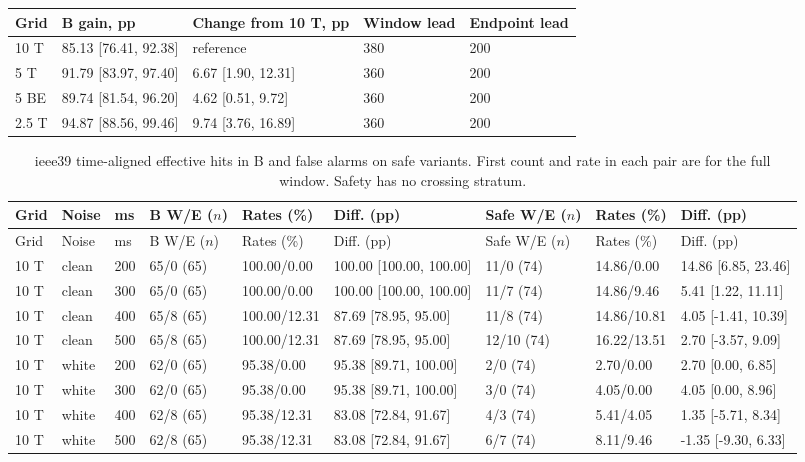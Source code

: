 \documentclass[10pt]{article}
\begin{document}
\begin{table}[htbp]
\begin{tabular}{@{}lllll@{}}
\toprule Grid & B gain, pp & Change from 10 T, pp & Window lead & Endpoint lead \\\midrule
10 T & 85.13 [76.41, 92.38] & reference & 380 & 200 \\
5 T & 91.79 [83.97, 97.40] & 6.67 [1.90, 12.31] & 360 & 200 \\
5 BE & 89.74 [81.54, 96.20] & 4.62 [0.51, 9.72] & 360 & 200 \\
2.5 T & 94.87 [88.56, 99.46] & 9.74 [3.76, 16.89] & 360 & 200 \\
\bottomrule\end{tabular}\end{table}\begingroup\footnotesize\setlength{\tabcolsep}{3pt}
\begin{longtable}{@{}lllllllll@{}}
\caption{ieee39 time-aligned effective hits in B and false alarms on safe variants. First count and rate in each pair are for the full window. Safety has no crossing stratum.}\label{tab:r2ieee39}\\
\toprule Grid & Noise & ms & B W/E ($n$) & Rates (\%) & Diff. (pp) & Safe W/E ($n$) & Rates (\%) & Diff. (pp) \\\midrule\endfirsthead
\toprule Grid & Noise & ms & B W/E ($n$) & Rates (\%) & Diff. (pp) & Safe W/E ($n$) & Rates (\%) & Diff. (pp) \\\midrule\endhead
10 T & clean & 200 & 65/0 (65) & 100.00/0.00 & 100.00 [100.00, 100.00] & 11/0 (74) & 14.86/0.00 & 14.86 [6.85, 23.46] \\
10 T & clean & 300 & 65/0 (65) & 100.00/0.00 & 100.00 [100.00, 100.00] & 11/7 (74) & 14.86/9.46 & 5.41 [1.22, 11.11] \\
10 T & clean & 400 & 65/8 (65) & 100.00/12.31 & 87.69 [78.95, 95.00] & 11/8 (74) & 14.86/10.81 & 4.05 [-1.41, 10.39] \\
10 T & clean & 500 & 65/8 (65) & 100.00/12.31 & 87.69 [78.95, 95.00] & 12/10 (74) & 16.22/13.51 & 2.70 [-3.57, 9.09] \\
10 T & white & 200 & 62/0 (65) & 95.38/0.00 & 95.38 [89.71, 100.00] & 2/0 (74) & 2.70/0.00 & 2.70 [0.00, 6.85] \\
10 T & white & 300 & 62/0 (65) & 95.38/0.00 & 95.38 [89.71, 100.00] & 3/0 (74) & 4.05/0.00 & 4.05 [0.00, 8.96] \\
10 T & white & 400 & 62/8 (65) & 95.38/12.31 & 83.08 [72.84, 91.67] & 4/3 (74) & 5.41/4.05 & 1.35 [-5.71, 8.34] \\
10 T & white & 500 & 62/8 (65) & 95.38/12.31 & 83.08 [72.84, 91.67] & 6/7 (74) & 8.11/9.46 & -1.35 [-9.30, 6.33] \\

\end{longtable}
\end{document}
